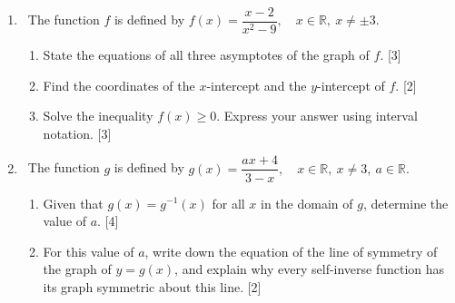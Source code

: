 \documentclass[12pt, twoside]{article}
\begin{document}
\begin{enumerate}[itemsep=0.25cm]
\newpage

\item[3.] [Maximum mark: 8] \ The function $f$ is defined by
$\displaystyle f(x)=\dfrac{x-2}{x^{2}-9}, \quad x\in\mathbb{R},\ x\ne\pm 3.$

\begin{enumerate}[itemsep=0.1cm]
  \item State the equations of all three asymptotes of the graph of $f$. \hfill [3]
  \item Find the coordinates of the $x$-intercept and the $y$-intercept of $f$.
  \hfill [2]
  \item Solve the inequality $f(x)\ge 0$. Express your answer using interval
  notation. \hfill [3]
\end{enumerate}

\medskip

\item[4.] [Maximum mark: 6] \ The function $g$ is defined by
$\displaystyle g(x)=\dfrac{ax+4}{3-x}, \quad x\in\mathbb{R},\ x\ne 3,\ a\in\mathbb{R}.$

\begin{enumerate}[itemsep=0.1cm]
  \item Given that $g(x)=g^{-1}(x)$ for all $x$ in the domain of $g$, determine
  the value of $a$. \hfill [4]
  \item For this value of $a$, write down the equation of the line of symmetry
  of the graph of $y=g(x)$, and explain why every self-inverse function has its
  graph symmetric about this line. \hfill [2]
\end{enumerate}

\end{enumerate}
\end{document}
